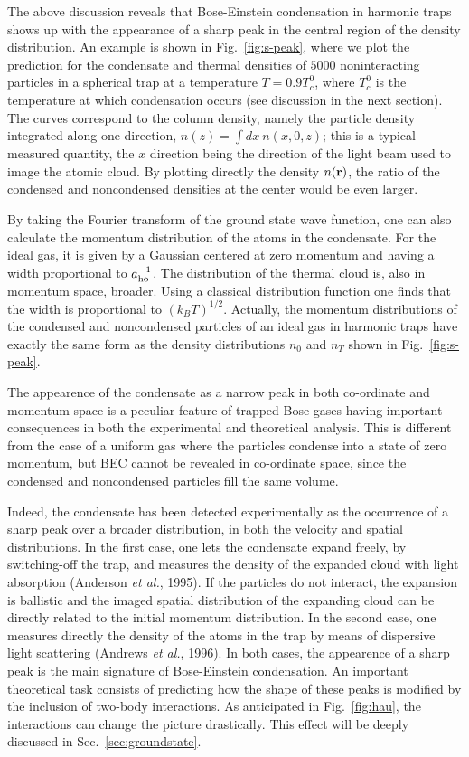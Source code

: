 The above discussion reveals that Bose-Einstein condensation in
harmonic traps shows up with the appearance of a sharp peak in the
central region  of the density distribution. An example is
shown in Fig.~\ref{fig:s-peak}, where we plot the prediction
for the condensate and thermal densities of $5000$ noninteracting
particles in a spherical trap at a temperature $T=0.9 T_c^0$,
where $T_c^0$ is the temperature at which condensation occurs (see
discussion in the next section). The curves correspond to the
column density, namely the particle density integrated along one
direction, $n(z) = \int dx \ n (x,0,z)$; this is a typical measured
quantity, the $x$ direction being the direction of the light beam
used to image the atomic cloud. By plotting directly the
density $n({\bf r})$, the ratio of the condensed and noncondensed 
densities at the center would be even larger. 

By taking the Fourier transform of the ground state wave function,
one can also calculate the momentum distribution of the atoms in the 
condensate. For the ideal gas, it is given by a Gaussian centered at
zero momentum and having a width proportional to $a_{\rm ho}^{-1}$.
The distribution of the thermal cloud is, also in momentum space, 
broader.  Using a classical distribution function one
finds that the width is proportional to $(k_B T)^{1/2}$.  Actually, the 
momentum distributions of the condensed and noncondensed particles 
of an ideal gas in harmonic traps have exactly the same form as the 
density distributions $n_0$ and $n_T$ shown in Fig.~\ref{fig:s-peak}. 

The appearence of the condensate as a narrow peak in both co-ordinate 
and momentum space is a peculiar feature of trapped Bose gases
having important consequences in both the experimental and theoretical 
analysis. This is different from the case of a uniform gas where the 
particles condense into a state of zero momentum,
but BEC cannot be revealed in co-ordinate space, since the condensed
and noncondensed particles fill the same volume.

Indeed, the condensate has been detected experimentally as the
occurrence of a sharp peak over a broader distribution, in both
the  velocity and spatial distributions.  In the
first case, one lets the condensate expand freely, by switching-off
the trap, and measures the density of the expanded cloud with
light absorption (Anderson {\it et al.}, 1995). If the particles
do not interact, the expansion is ballistic and the imaged spatial
distribution of the expanding cloud can be directly related to
the initial momentum distribution.  In the second case, one
measures directly the density of the atoms in the trap by means
of dispersive light scattering (Andrews {\it et al.}, 1996).
In both cases, the appearence of a sharp peak is the main
signature of Bose-Einstein condensation. An important theoretical
task consists of predicting how the shape of these peaks is
modified by the inclusion of two-body interactions. As anticipated
in Fig.~\ref{fig:hau}, the interactions can change the picture 
drastically. This effect will be deeply discussed in 
Sec.~\ref{sec:groundstate}. 

